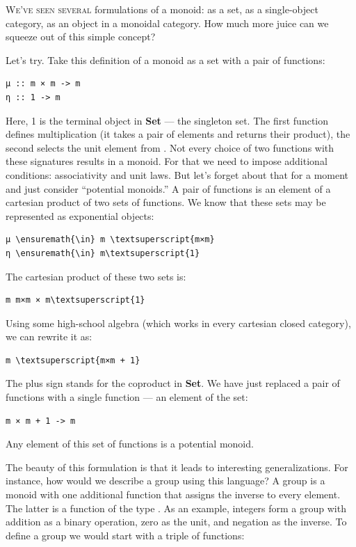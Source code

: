 \lettrine[lhang=0.17]{W}{e've seen several} formulations of a monoid: as a set, as a
single-object category, as an object in a monoidal category. How much
more juice can we squeeze out of this simple concept?

Let's try. Take this definition of a monoid as a set  with a
pair of functions:

\begin{Verbatim}[commandchars=\\\{\}]
μ :: m × m -> m
η :: 1 -> m
\end{Verbatim}
Here, 1 is the terminal object in \textbf{Set} --- the singleton set.
The first function defines multiplication (it takes a pair of elements
and returns their product), the second selects the unit element from
. Not every choice of two functions with these signatures
results in a monoid. For that we need to impose additional conditions:
associativity and unit laws. But let's forget about that for a moment
and just consider ``potential monoids.'' A pair of functions is an
element of a cartesian product of two sets of functions. We know that
these sets may be represented as exponential objects:

\begin{Verbatim}[commandchars=\\\{\}]
μ \ensuremath{\in} m \textsuperscript{m×m}
η \ensuremath{\in} m\textsuperscript{1}
\end{Verbatim}
The cartesian product of these two sets is:

\begin{Verbatim}[commandchars=\\\{\}]
m m×m × m\textsuperscript{1}
\end{Verbatim}
Using some high-school algebra (which works in every cartesian closed
category), we can rewrite it as:

\begin{Verbatim}[commandchars=\\\{\}]
m \textsuperscript{m×m + 1}
\end{Verbatim}
The plus sign stands for the coproduct in \textbf{Set}. We have just
replaced a pair of functions with a single function --- an element of
the set:

\begin{Verbatim}[commandchars=\\\{\}]
m × m + 1 -> m
\end{Verbatim}
Any element of this set of functions is a potential monoid.

The beauty of this formulation is that it leads to interesting
generalizations. For instance, how would we describe a group using this
language? A group is a monoid with one additional function that assigns
the inverse to every element. The latter is a function of the type
. As an example, integers form a group with
addition as a binary operation, zero as the unit, and negation as the
inverse. To define a group we would start with a triple of functions:

